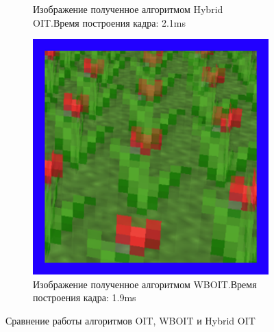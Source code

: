 \begin{figure}[!htbp]
\begin{subfigure}[b]{0.3\textwidth}
					\caption{Изображение полученное алгоритмом Hybrid OIT.\linebreak Время построения кадра: 2.1ms}
					\label{fig:hybrid_flower}
				\end{subfigure}			
				\begin{subfigure}[b]{0.3\textwidth}
					\centering
					\includegraphics[width=\textwidth]{my_folder/images//wboit_flower}
					\caption{Изображение полученное алгоритмом WBOIT.\linebreak Время построения кадра: 1.9ms}
					\label{fig:wboit_flower}
				\end{subfigure}
			\captionsetup{justification=centering} %
			\caption{Сравнение работы алгоритмов OIT, WBOIT и Hybrid OIT}\label{fig:oit_vs_wboit_vs_hybrid} 
		\end{figure}